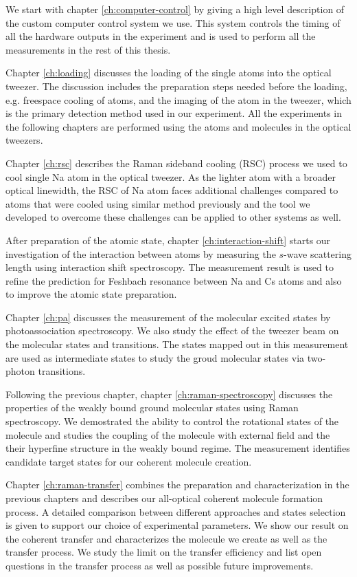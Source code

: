 We start with chapter \ref{ch:computer-control} by giving a high level description of
the custom computer control system we use.
This system controls the timing of all the hardware outputs in the experiment
and is used to perform all the measurements in the rest of this thesis.

Chapter \ref{ch:loading} discusses the loading of the single atoms into the optical tweezer.
The discussion includes the preparation steps needed before the loading,
e.g. freespace cooling of atoms,
and the imaging of the atom in the tweezer,
which is the primary detection method used in our experiment.
All the experiments in the following chapters are performed using
the atoms and molecules in the optical tweezers.

Chapter \ref{ch:rsc} describes the Raman sideband cooling (RSC) process
we used to cool single Na atom in the optical tweezer.
As the lighter atom with a broader optical linewidth,
the RSC of Na atom faces additional challenges compared to atoms
that were cooled using similar method previously
and the tool we developed to overcome these challenges can be applied to other systems as well.

After preparation of the atomic state,
chapter \ref{ch:interaction-shift} starts our investigation of the interaction between atoms
by measuring the $s$-wave scattering length using interaction shift spectroscopy.
The measurement result is used to refine the prediction for Feshbach resonance
between Na and Cs atoms and also to improve the atomic state preparation.

Chapter \ref{ch:pa} discusses the measurement of the molecular excited states
by photoassociation spectroscopy.
We also study the effect of the tweezer beam on the molecular states and transitions.
The states mapped out in this measurement are used as intermediate states
to study the groud molecular states via two-photon transitions.

Following the previous chapter, chapter \ref{ch:raman-spectroscopy} discusses
the properties of the weakly bound ground molecular states using Raman spectroscopy.
We demostrated the ability to control the rotational states of the molecule
and studies the coupling of the molecule with external field
and the their hyperfine structure in the weakly bound regime.
The measurement identifies candidate target states for our coherent molecule creation.

Chapter \ref{ch:raman-transfer} combines the preparation and characterization
in the previous chapters and describes our all-optical coherent molecule formation process.
A detailed comparison between different approaches and states selection is given
to support our choice of experimental parameters.
We show our result on the coherent transfer and characterizes
the molecule we create as well as the transfer process.
We study the limit on the transfer efficiency
and list open questions in the transfer process
as well as possible future improvements.
